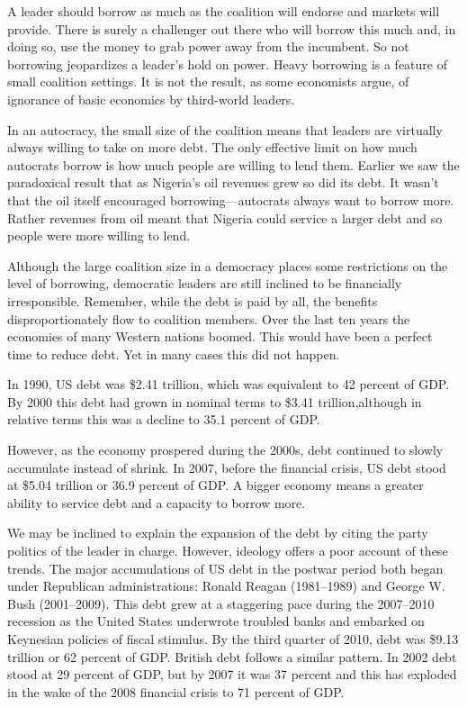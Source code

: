 \documentclass[10pt]{article}
\begin{document}
{\large A leader should borrow as much as the coalition will endorse and markets
will provide. There is surely a challenger out there who will borrow this much
and, in doing so, use the money to grab power away from the incumbent. So not
borrowing jeopardizes a leader's hold on power. Heavy borrowing is a feature of
small coalition settings. It is not the result, as some economists argue, of
ignorance of basic economics by third-world leaders.}

{\large In an autocracy, the small size of the coalition means that leaders are
virtually always willing to take on more debt. The only effective limit on how
much autocrats borrow is how much people are willing to lend them. Earlier we saw
the paradoxical result that as Nigeria's oil revenues grew so did its debt. It
wasn't that the oil itself encouraged borrowing---autocrats always want to borrow
more. Rather revenues from oil meant that Nigeria could service a larger debt and
so people were more willing to lend.}

{\large Although the large coalition size in a democracy places some
restrictions on the level of borrowing, democratic leaders are still inclined to
be financially irresponsible. Remember, while the debt is paid by all, the
benefits disproportionately flow to coalition members. Over the last ten years
the economies of many Western nations boomed. This would have been a perfect time
to reduce debt. Yet in many cases this did not happen.}

{\large In 1990, US debt was \$2.41 trillion, which was equivalent to 42 percent
of GDP. By 2000 this debt had grown in nominal terms to \$3.41 trillion,although
in relative terms this was a decline to 35.1 percent of GDP.}

{\large However, as the economy prospered during the 2000s, debt continued to
slowly accumulate instead of shrink. In 2007, before the financial crisis, US
debt stood at \$5.04 trillion or 36.9 percent of GDP. A bigger economy means a
greater ability to service debt and a capacity to borrow more.}

{\large We may be inclined to explain the expansion of the debt by citing the
party politics of the leader in charge. However, ideology offers a poor account
of these trends. The major accumulations of US debt in the postwar period both
began under Republican administrations: Ronald Reagan (1981--1989) and George W.
Bush (2001--2009). This debt grew at a staggering pace during the 2007--2010
recession as the United States underwrote troubled banks and embarked on
Keynesian policies of fiscal stimulus. By the third quarter of 2010, debt was
\$9.13 trillion or 62 percent of GDP. British debt follows a similar pattern. In
2002 debt stood at 29 percent of GDP, but by 2007 it was 37 percent and this has
exploded in the wake of the 2008 financial crisis to 71 percent of GDP.}
\end{document}
